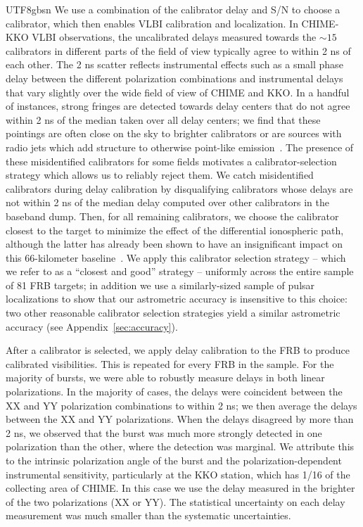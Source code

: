 \documentclass[twocolumn,linenumbers]{aastex631}
\begin{document}
\begin{CJK*}{UTF8}{gbsn}
We use a combination of the calibrator delay and S/N to choose a calibrator, which then enables VLBI calibration and localization. In CHIME-KKO VLBI observations, the uncalibrated delays measured towards the $\sim 15$ calibrators in different parts of the field of view typically agree to within 2 ns of each other. The 2 ns scatter reflects instrumental effects such as a small phase delay between the different polarization combinations and instrumental delays that vary slightly over the wide field of view of CHIME and KKO. In a handful of instances, strong fringes are detected towards delay centers that do not agree within 2 ns of the median taken over all delay centers; we find that these pointings are often close on the sky to brighter calibrators or are sources with radio jets which add structure to otherwise point-like emission~\citep{andrew2024vlbi}. 
The presence of these misidentified calibrators for some fields motivates a calibrator-selection strategy which allows us to reliably reject them. We catch misidentified calibrators during delay calibration by disqualifying calibrators whose delays are not within 2 ns of the median delay computed over other calibrators in the baseband dump. 
Then, for all remaining calibrators, we choose the calibrator closest to the target to minimize the effect of the differential ionospheric path, although the latter has already been shown to have an insignificant impact on this 66-kilometer baseline~\citep{lanman2024chime}. We apply this calibrator selection strategy -- which we refer to as a ``closest and good'' strategy -- uniformly across the entire sample of 81 FRB targets; in addition we use a similarly-sized sample of pulsar localizations to show that our astrometric accuracy is insensitive to this choice: two other reasonable calibrator selection strategies yield a similar astrometric accuracy (see Appendix~\ref{sec:accuracy}).

After a calibrator is selected, we apply delay calibration to the FRB to produce calibrated visibilities. This is repeated for every FRB in the sample. For the majority of bursts, we were able to robustly measure delays in both linear polarizations. In the majority of cases, the delays were coincident between the XX and YY polarization combinations to within 2 ns; we then average the delays between the XX and YY polarizations. When the delays disagreed by more than 2 ns, we observed that the burst was much more strongly detected in one polarization than the other, where the detection was marginal. We attribute this to the intrinsic polarization angle of the burst and the polarization-dependent instrumental sensitivity, particularly at the KKO station, which has 1/16 of the collecting area of CHIME. In this case we use the delay measured in the brighter of the two polarizations (XX or YY). The statistical uncertainty on each delay measurement was much smaller than the systematic uncertainties.


\end{CJK*}
\end{document}
